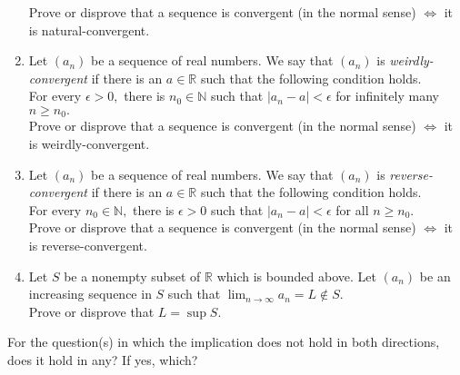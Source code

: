 \documentclass{article}
\begin{document}
\begin{enumerate}
	Prove or disprove that a sequence is convergent (in the normal sense) $\iff$ it is natural-convergent.
	\item Let $(a_n)$ be a sequence of real numbers. We say that $(a_n)$ is \emph{weirdly-convergent} if there is an $a \in \mathbb{R}$ such that the following condition holds.\\
	For every $\epsilon > 0,$ there is $n_0 \in \mathbb{N}$ such that $|a_n - a| < \epsilon$ for infinitely many $n \ge n_0.$\\
	Prove or disprove that a sequence is convergent (in the normal sense) $\iff$ it is weirdly-convergent.
	\item Let $(a_n)$ be a sequence of real numbers. We say that $(a_n)$ is \emph{reverse-convergent} if there is an $a \in \mathbb{R}$ such that the following condition holds.\\
	For every $n_0 \in \mathbb{N},$ there is $\epsilon > 0$ such that $|a_n - a| < \epsilon$ for all $n \ge n_0.$\\
	Prove or disprove that a sequence is convergent (in the normal sense) $\iff$ it is reverse-convergent.
	\item Let $S$ be a nonempty subset of $\mathbb{R}$ which is bounded above. Let $(a_n)$ be an increasing sequence in $S$ such that $\displaystyle\lim_{n\to \infty}a_n = L \not\in S.$\\
	 Prove or disprove that $L = \sup S.$ 
\end{enumerate}
For the question(s) in which the implication does not hold in both directions, does it hold in any? If yes, which?
\end{document}
